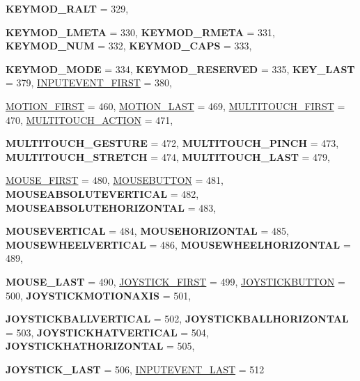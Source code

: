 \begin{DoxyCompactItemize}
{\bfseries KEYMOD\_\-RALT} =  329, 
\par
{\bfseries KEYMOD\_\-LMETA} =  330, 
{\bfseries KEYMOD\_\-RMETA} =  331, 
{\bfseries KEYMOD\_\-NUM} =  332, 
{\bfseries KEYMOD\_\-CAPS} =  333, 
\par
{\bfseries KEYMOD\_\-MODE} =  334, 
{\bfseries KEYMOD\_\-RESERVED} =  335, 
{\bfseries KEY\_\-LAST} =  379, 
\hyperlink{classphys_1_1MetaCode_a3e501cbb5bf0f6f1fdb7211465bda8d8a87685f9ca9462b329f2b86a17514f136}{INPUTEVENT\_\-FIRST} =  380, 
\par
\hyperlink{classphys_1_1MetaCode_a3e501cbb5bf0f6f1fdb7211465bda8d8a355649b334e903ada2496ad39dcd5f9d}{MOTION\_\-FIRST} =  460, 
\hyperlink{classphys_1_1MetaCode_a3e501cbb5bf0f6f1fdb7211465bda8d8a59cc92f5b2f42f7a138f8ea22e92d626}{MOTION\_\-LAST} =  469, 
\hyperlink{classphys_1_1MetaCode_a3e501cbb5bf0f6f1fdb7211465bda8d8acdb03d23d93022d5962db5026475b9c7}{MULTITOUCH\_\-FIRST} =  470, 
\hyperlink{classphys_1_1MetaCode_a3e501cbb5bf0f6f1fdb7211465bda8d8a94d804dc2330be620a8009252b5d5d22}{MULTITOUCH\_\-ACTION} =  471, 
\par
{\bfseries MULTITOUCH\_\-GESTURE} =  472, 
{\bfseries MULTITOUCH\_\-PINCH} =  473, 
{\bfseries MULTITOUCH\_\-STRETCH} =  474, 
{\bfseries MULTITOUCH\_\-LAST} =  479, 
\par
\hyperlink{classphys_1_1MetaCode_a3e501cbb5bf0f6f1fdb7211465bda8d8a1bb7f008c7d430e886141a3b8b697129}{MOUSE\_\-FIRST} =  480, 
\hyperlink{classphys_1_1MetaCode_a3e501cbb5bf0f6f1fdb7211465bda8d8a9cc80a2db206fb540fbb92a8ff64268a}{MOUSEBUTTON} =  481, 
{\bfseries MOUSEABSOLUTEVERTICAL} =  482, 
{\bfseries MOUSEABSOLUTEHORIZONTAL} =  483, 
\par
{\bfseries MOUSEVERTICAL} =  484, 
{\bfseries MOUSEHORIZONTAL} =  485, 
{\bfseries MOUSEWHEELVERTICAL} =  486, 
{\bfseries MOUSEWHEELHORIZONTAL} =  489, 
\par
{\bfseries MOUSE\_\-LAST} =  490, 
\hyperlink{classphys_1_1MetaCode_a3e501cbb5bf0f6f1fdb7211465bda8d8a666e564cae666de739b9b3cf047ec578}{JOYSTICK\_\-FIRST} =  499, 
\hyperlink{classphys_1_1MetaCode_a3e501cbb5bf0f6f1fdb7211465bda8d8aaaa2af6a60a9cd7403aa4786ef1ea389}{JOYSTICKBUTTON} =  500, 
{\bfseries JOYSTICKMOTIONAXIS} =  501, 
\par
{\bfseries JOYSTICKBALLVERTICAL} =  502, 
{\bfseries JOYSTICKBALLHORIZONTAL} =  503, 
{\bfseries JOYSTICKHATVERTICAL} =  504, 
{\bfseries JOYSTICKHATHORIZONTAL} =  505, 
\par
{\bfseries JOYSTICK\_\-LAST} =  506, 
\hyperlink{classphys_1_1MetaCode_a3e501cbb5bf0f6f1fdb7211465bda8d8adc78bfd04a85c4bbe39718f9acacbbe3}{INPUTEVENT\_\-LAST} =  512

\end{DoxyCompactItemize}
